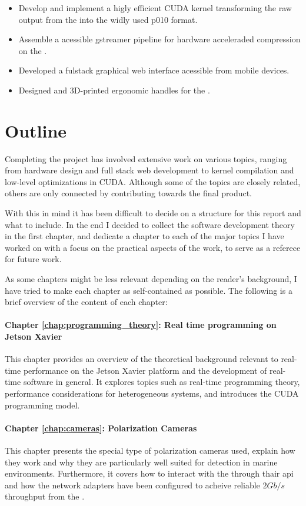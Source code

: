 \begin{itemize}
    \item Develop and implement a higly efficient CUDA kernel transforming the raw output from the \cams into the widly used \gls{p010} format.
    \item Assemble a \py acessible \gls{gstreamer} pipeline for hardware acceleraded compression on the \jx.
    \item Developed a fulstack graphical web interface acessible from mobile devices.
    \item Designed and 3D-printed ergonomic handles for the \sr.
\end{itemize}


\section{Outline}
Completing the \sr project has involved extensive work on various topics, ranging from hardware design and full stack web development to kernel compilation and low-level optimizations in CUDA.
Although some of the topics are closely related, others are only connected  by contributing towards the final product.

With this in mind it has been difficult to decide on a structure for this report and what to include.
In the end I decided to collect the software development theory in the first chapter, and dedicate a chapter to each of the major topics I have worked on with a focus on the practical aspects of the work, to serve as a referece for future work.

As some chapters might be less relevant depending on the reader's background, I have tried to make each chapter as self-contained as possible.
The following is a brief overview of the content of each chapter:

\paragraph{Chapter \ref{chap:programming_theory}: Real time programming on Jetson Xavier}
This chapter provides an overview of the theoretical background relevant to real-time performance on the Jetson Xavier platform and the development of real-time software in general.
It explores topics such as real-time programming theory, performance considerations for heterogeneous systems, and introduces the CUDA programming model.

\paragraph{Chapter \ref{chap:cameras}: Polarization Cameras}
This chapter presents the special type of polarization cameras used, explain how they work and why they are particularly well suited for detection in marine environments.
Furthermore, it covers how to interact with the \cams through thair \gls{api} and how the network adapters have been configured to acheive reliable $2Gb/s$ throughput from the \cams.

